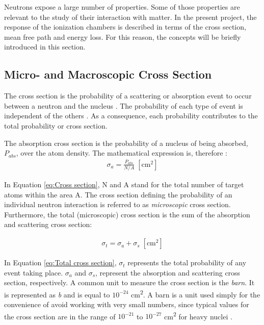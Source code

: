 Neutrons expose a large number of properties. Some of those properties are relevant to the study of their interaction with matter. In the present project, the response of the ionization chambers is described in terms of the cross section, mean free path and energy loss. For this reason, the concepts will be briefly introduced in this section.

\subsection{Micro- and Macroscopic Cross Section}

The cross section is the probability of a scattering or absorption event to occur between a neutron and the nucleus \cite{rinard1991neutron}. The probability of each type of event is independent of the others \cite{rinard1991neutron}. As a consequence, each probability contributes to the total probability or cross section.

The absorption cross section is the probability of a nucleus of being absorbed, $P_{abs}$, over the atom density. The mathematical expression is, therefore \cite{rinard1991neutron}:
\begin{align} 
    \label{eq:Cross section}
    {\sigma_a = \frac{P_{abs}}{N / A} } \; [\unit{\square\cm}]
\end{align}

In Equation \ref{eq:Cross section}, N and A stand for the total number of target atoms within the area A.  The cross section defining the probability of an individual neutron interaction is referred to as \textit{microscopic} cross section. Furthermore, the total (microscopic) cross section is the sum of the absorption and scattering cross section:

\begin{align} 
    \label{eq:Total cross section}
    {\sigma_t = \sigma_a + \sigma_s } \; [\unit{\square\cm}]
\end{align}

In Equation \ref{eq:Total cross section}, $\sigma_t$ represents the total probability of any event taking place. $\sigma_a$ and $\sigma_s$, represent the absorption and scattering cross section, respectively. A common unit to measure the cross section is the \textit{barn}. It is represented as \textit{b} and is equal to $10^{-24}$ \unit{\square\cm}. A barn is a unit used simply for the convenience of avoid working with very small numbers, since typical values for the cross section are in the range of $10^{-21}$ to $10^{-27}$ \unit{\square\cm} for heavy nuclei \cite{rinard1991neutron}. 

